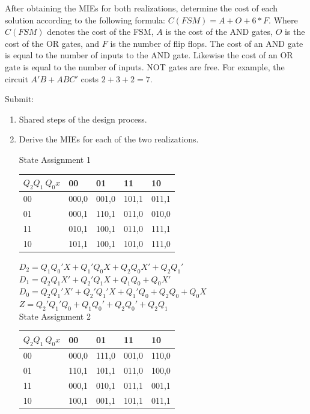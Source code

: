 \begin{enumerate}
After obtaining the MIEs for both realizations, determine the cost 
of each solution according to the following formula: 
$C(FSM) = A + O + 6*F$.  Where $C(FSM)$ denotes
the cost of the FSM, 
$A$ is the cost of the AND gates,  
$O$ is the cost of the OR gates, and 
$F$ is the number of flip flops.  
The cost of an AND gate is equal to the number of inputs to the 
AND gate.  Likewise the cost of an OR gate is equal to the number
of inputs.  NOT gates are free. For example, the circuit 
$A'B + ABC'$ costs $2+3+2=7$.  

Submit:
\begin{enumerate}
\item Shared steps of the design process.
\item Derive the MIEs for each of the two realizations.
\begin{solution}{

State Assignment 1

\begin{tabular}{l|l|l|l|l}
$Q_2 Q_1 \ Q_0 x$  & 00 & 01  & 11 & 10 \\ \hline
00  & 000,0 & 001,0 & 101,1 & 011,1  \\ \hline
01  & 000,1 & 110,1 & 011,0 & 010,0  \\ \hline
11  & 010,1 & 100,1 & 011,0 & 111,1  \\ \hline
10  & 101,1 & 100,1 & 101,0 & 111,0  \\ 
\end{tabular}

$D_2 = Q_1Q_0'X + Q_1'Q_0X + Q_2Q_0X' + Q_2Q_1'$		\\
$D_1 = Q_2Q_1X' + Q_2'Q_1X + Q_1Q_0 + Q_0X'$			\\ 
$D_0 = Q_2Q_1'X' + Q_2'Q_1'X + Q_1'Q_0 + Q_2Q_0 + Q_0X$ 	\\    
$Z   = Q_2'Q_1'Q_0 + Q_1Q_0' + Q_2Q_0' + Q_2Q_1$		\\ 

State Assignment 2

\begin{tabular}{l|l|l|l|l}
$Q_2 Q_1 \ Q_0 x$  & 00 & 01  & 11 & 10 \\ \hline
00  & 000,0 & 111,0 & 001,0 & 110,0  \\ \hline
01  & 110,1 & 101,1 & 011,0 & 100,0  \\ \hline
11  & 000,1 & 010,1 & 011,1 & 001,1  \\ \hline
10  & 100,1 & 001,1 & 101,1 & 011,1  \\ 
\end{tabular} 

}
\end{solution}
\end{enumerate}
\end{enumerate}
